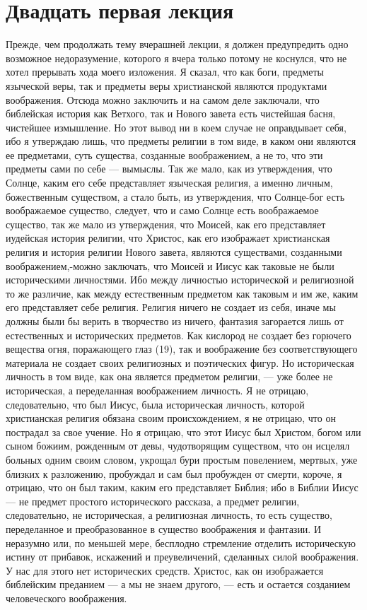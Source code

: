 \documentclass[12pt]{article}
\begin{document}
\section*{Двадцать первая лекция}

Прежде, чем продолжать тему вчерашней лекции, я должен предупредить одно возможное недоразумение, которого я вчера только потому не коснулся, что не хотел прерывать хода моего изложения. Я сказал, что как боги, предметы языческой веры, так и предметы веры христианской являются продуктами воображения. Отсюда можно заключить и на самом деле заключали, что библейская история как Ветхого, так и Нового завета есть чистейшая басня, чистейшее измышление. Но этот вывод ни в коем случае не оправдывает себя, ибо я утверждаю лишь, что предметы религии в том виде, в каком они являются ее предметами, суть существа, созданные воображением, а не то, что эти предметы сами по себе --- вымыслы. Так же мало, как из утверждения, что Солнце, каким его себе представляет языческая религия, а именно личным, божественным существом, а стало быть, из утверждения, что Солнце-бог есть воображаемое существо, следует, что и само Солнце есть воображаемое существо, так же мало из утверждения, что Моисей, как его представляет иудейская история религии, что Христос, как его изображает христианская религия и история религии Нового завета, являются существами, созданными воображением,-можно заключать, что Моисей и Иисус как таковые не были историческими личностями. Ибо между личностью исторической и религиозной то же различие, как между естественным предметом как таковым и им же, каким его представляет себе религия. Религия ничего не создает из себя, иначе мы должны были бы верить в творчество из ничего, фантазия загорается лишь от естественных и исторических предметов. Как кислород не создает без горючего вещества огня, поражающего глаз (19), так и воображение без соответствующего материала не создает своих религиозных и поэтических фигур. Но историческая личность в том виде, как она является предметом религии, --- уже более не историческая, а переделанная воображением личность. Я не отрицаю, следовательно, что был Иисус, была историческая личность, которой христианская религия обязана своим происхождением, я не отрицаю, что он пострадал за свое учение. Но я отрицаю, что этот Иисус был Христом, богом или сыном божиим, рожденным от девы, чудотворящим существом, что он исцелял больных одним своим словом, укрощал бури простым повелением, мертвых, уже близких к разложению, пробуждал и сам был пробужден от смерти, короче, я отрицаю, что он был таким, каким его представляет Библия; ибо в Библии Иисус --- не предмет простого исторического рассказа, а предмет религии, следовательно, не историческая, а религиозная личность, то есть существо, переделанное и преобразованное в существо воображения и фантазии. И неразумно или, по меньшей мере, бесплодно стремление отделить историческую истину от прибавок, искажений и преувеличений, сделанных силой воображения. У нас для этого нет исторических средств. Христос, как он изображается библейским преданием --- а мы не знаем другого, --- есть и остается созданием человеческого воображения. 
\end{document}
